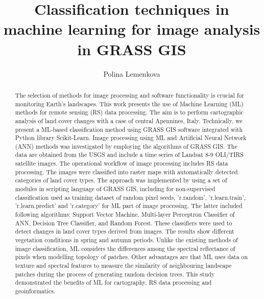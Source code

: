 \documentclass[preprint,12pt,authoryear]{elsarticle}
\begin{document}
\begin{frontmatter}



\title{Classification techniques in machine learning for image analysis in GRASS GIS}

\author{Polina Lemenkova}

\begin{abstract}
The selection of methods for image processing and software functionality is crucial for monitoring Earth's landscapes. This work presents the use of Machine Learning (ML) methods for remote sensing (RS) data processing. The aim is to perform cartographic analysis of land cover changes with a case of central Apennines, Italy. Technically, we present a ML-based classification method using GRASS GIS software integrated with Python library Scikit-Learn. Image processing using ML and Artificial Neural Network (ANN) methods was investigated by employing the algorithms of GRASS GIS. The data are obtained from the USGS and include a time series of Landsat 8-9 OLI/TIRS satellite images. The operational workflow of image processing includes RS data processing. The images were classified into raster maps with automatically detected categories of land cover types. The approach was implemented by using a set of modules in scripting language of GRASS GIS, including for non-supervised classification used as training dataset of random pixel seeds, 'r.random', 'r.learn.train', 'r.learn.predict' and 'r.category' for ML part of image processing. The latter included following algorithms: Support Vector Machine, Multi-layer Perceptron Classifier of ANN, Decision Tree Classifier, and Random Forest. These classifiers were used to detect changes in land cover types derived from images. The results show different vegetation conditions in spring and autumn periods. Unlike the existing methods of image classification, ML considers the differences among the spectral reflectance of pixels when modelling topology of  patches. Other advantages are that ML uses data on texture and spectral features to measure the similarity of neighbouring landscape patches during the process of generating random decision trees.  This study demonstrated the benefits of ML for cartography, RS data processing and geoinformatics.
\end{abstract}


\end{frontmatter}
\end{document}
